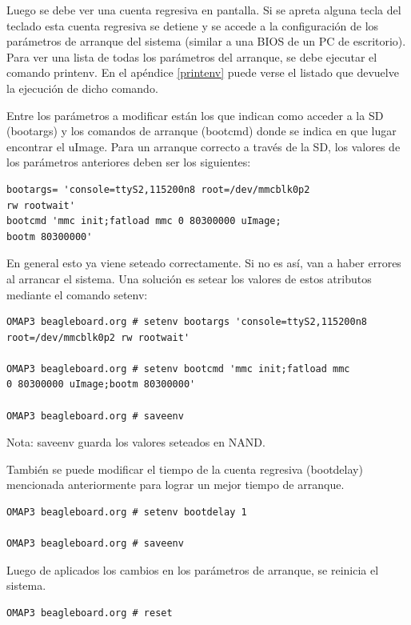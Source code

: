 Luego se debe ver una cuenta regresiva en pantalla. 
Si se apreta alguna tecla del teclado esta cuenta regresiva se detiene y se accede a la configuración de los parámetros de arranque del sistema (similar a una BIOS de un PC de escritorio). Para ver una lista de todas los parámetros del arranque, se debe ejecutar el comando printenv. En el apéndice \ref{printenv} puede verse el listado que devuelve la ejecución de dicho comando.

\bigskip
Entre los parámetros a modificar están los que indican como acceder a la SD (bootargs) y los comandos de arranque (bootcmd) donde se indica en que lugar encontrar el uImage. Para un arranque correcto a través de la SD, los valores de los parámetros anteriores deben ser los siguientes:

\begin{verbatim}
bootargs= 'console=ttyS2,115200n8 root=/dev/mmcblk0p2 
rw rootwait' 
bootcmd 'mmc init;fatload mmc 0 80300000 uImage;
bootm 80300000' 
\end{verbatim}

En general esto ya viene seteado correctamente. Si no es así, van a haber errores al arrancar el sistema. Una solución es setear los valores de estos atributos mediante el comando setenv:

\begin{verbatim}
OMAP3 beagleboard.org # setenv bootargs 'console=ttyS2,115200n8 
root=/dev/mmcblk0p2 rw rootwait' 

OMAP3 beagleboard.org # setenv bootcmd 'mmc init;fatload mmc 
0 80300000 uImage;bootm 80300000' 

OMAP3 beagleboard.org # saveenv 
\end{verbatim}

Nota: saveenv guarda los valores seteados en NAND.

\bigskip
También se puede modificar el tiempo de la cuenta regresiva (bootdelay) mencionada anteriormente para lograr un mejor tiempo de arranque.

\begin{verbatim}
OMAP3 beagleboard.org # setenv bootdelay 1

OMAP3 beagleboard.org # saveenv 
\end{verbatim}

Luego de aplicados los cambios en los parámetros de arranque, se reinicia el sistema.

\begin{verbatim}
OMAP3 beagleboard.org # reset 
\end{verbatim}

